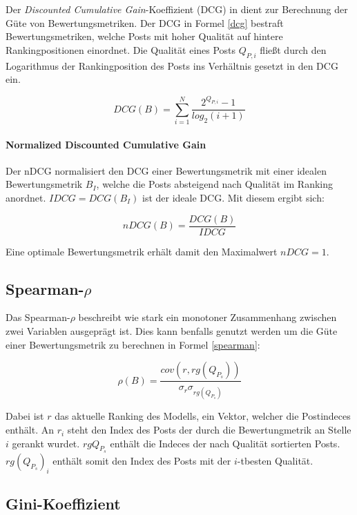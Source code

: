 Der \textit{Discounted Cumulative Gain}-Koeffizient (DCG) in \cite{Biega2018405} dient zur Berechnung der Güte von Bewertungsmetriken. Der DCG in Formel \ref{dcg} bestraft Bewertungsmetriken, welche Posts mit hoher Qualität auf hintere Rankingpositionen einordnet. Die Qualität eines Posts $Q_{P,i}$ fließt durch den Logarithmus der Rankingposition des Posts ins Verhältnis gesetzt in den DCG ein.

\begin{equation}
\label{dcg}
DCG(B) = \sum_{i = 1}^{N}\frac{2^{Q_{P,i}}-1}{log_2(i + 1)}
\end{equation} 

\paragraph{Normalized Discounted Cumulative Gain}

Der nDCG normalisiert den DCG einer Bewertungsmetrik mit einer idealen Bewertungsmetrik $B_I$, welche die Posts absteigend nach Qualität im Ranking anordnet. $IDCG = DCG(B_I)$ ist der ideale DCG. Mit diesem ergibt sich:

\begin{equation}
\label{ndcg}
nDCG(B) = \frac{DCG(B)}{IDCG} 
\end{equation}

Eine optimale Bewertungsmetrik erhält damit den Maximalwert $nDCG = 1$.

\subsection{Spearman-$\rho$}

Das Spearman-$\rho$ beschreibt wie stark ein monotoner Zusammenhang zwischen zwei Variablen ausgeprägt ist. Dies kann benfalls genutzt werden um die Güte einer Bewertungsmetrik zu berechnen in Formel \ref{spearman}:

\begin{equation}
\label{spearman}
\rho(B) = \frac{cov(r,rg(Q_{P_s}))}{\sigma_r\sigma_{rg(Q_{P_s})}} 
\end{equation}

Dabei ist $r$ das aktuelle Ranking des Modells, ein Vektor, welcher die Postindeces enthält. An $r_i$ steht den Index des Posts der durch die Bewertungmetrik an Stelle $i$ gerankt wurdet. $rg{Q_{P_s}}$ enthält die Indeces der nach Qualität sortierten Posts. $rg(Q_{P_s})_i$ enthält somit den Index des Posts mit der $i$-tbesten Qualität.


\subsection{Gini-Koeffizient}

